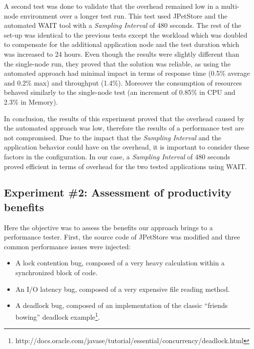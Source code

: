 \documentclass[runningheads,a4paper]{llncs}
\begin{document}
A second test was done to validate that the overhead remained low in a
multi-node environment over a longer test run. This test used JPetStore and the
automated WAIT tool with a \emph{Sampling Interval} of 480 seconds. The rest of
the set-up was identical to the previous tests except the workload which was doubled
to compensate for the additional application node and the test duration which
was increased to 24 hours. Even though the results were slightly different than the
single-node run, they proved that the solution was reliable, as using the
automated approach had minimal impact in terms of response time (0.5\% 
average and 0.2\% max) and throughput (1.4\%). Moreover the consumption
of resources behaved similarly to the single-node test (an increment of 0.85\%
in CPU and 2.3\% in Memory). 


In conclusion, the results of this experiment proved that the
overhead caused by the automated approach was low, therefore the results of a
performance test are not compromised. Due to the impact that the \emph{Sampling
Interval} and the application behavior could have on the overhead, it is important to 
consider these factors in the configuration. In our case, a \emph{Sampling
Interval} of 480 seconds proved efficient in terms of overhead for the two tested applications using WAIT.

\vspace{-7pt}
\subsection{Experiment \#2: Assessment of productivity benefits}
\label{Experiment_2_Results}
\vspace{-7pt}

Here the objective was to assess the benefits our approach brings to a
performance tester. First, the source code of JPetStore was modified and three
common performance issues were injected: 
\vspace{-7pt}
\begin{itemize}
	\item A lock contention bug, composed of a very heavy calculation within a
	synchronized block of code.
	\item An I/O latency bug, composed of a very expensive file reading method.
	\item A deadlock bug, composed of an implementation of the classic ``friends
	bowing'' deadlock
	example\footnote{http://docs.oracle.com/javase/tutorial/essential/concurrency/deadlock.html}.
\end{itemize}
\end{document}
